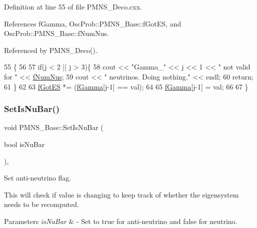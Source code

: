Definition at line 55 of file P\+M\+N\+S\+\_\+\+Deco.\+cxx.



References f\+Gamma, Osc\+Prob\+::\+P\+M\+N\+S\+\_\+\+Base\+::f\+Got\+ES, and Osc\+Prob\+::\+P\+M\+N\+S\+\_\+\+Base\+::f\+Num\+Nus.



Referenced by P\+M\+N\+S\+\_\+\+Deco().


\begin{DoxyCode}
55                                          \{
56 
57   \textcolor{keywordflow}{if}(j < 2 || j > 3)\{
58     cout << \textcolor{stringliteral}{"Gamma\_"} << j << 1 << \textcolor{stringliteral}{" not valid for "} << \hyperlink{classOscProb_1_1PMNS__Base_a24bb74bed63569dfe88b18fa6a08060e}{fNumNus};
59     cout << \textcolor{stringliteral}{" neutrinos. Doing nothing."} << endl;
60     \textcolor{keywordflow}{return};
61   \}
62 
63   \hyperlink{classOscProb_1_1PMNS__Base_a6dc5cd010d2d70b2324745b4e53e9839}{fGotES} *= (\hyperlink{classOscProb_1_1PMNS__Deco_ae2f30ac9f8b25344959f1698616d337a}{fGamma}[j-1] == val);
64   
65   \hyperlink{classOscProb_1_1PMNS__Deco_ae2f30ac9f8b25344959f1698616d337a}{fGamma}[j-1] = val;
66   
67 \}
\end{DoxyCode}
\mbox{\label{classOscProb_1_1PMNS__Base_a717e0348cf762f3961854e332a9b52e0}} 
\subsubsection{\texorpdfstring{Set\+Is\+Nu\+Bar()}{SetIsNuBar()}}
{\footnotesize\ttfamily void P\+M\+N\+S\+\_\+\+Base\+::\+Set\+Is\+Nu\+Bar (\begin{DoxyParamCaption}\item[{bool}]{is\+Nu\+Bar }\end{DoxyParamCaption})\hspace{0.3cm}{\ttfamily [virtual]}, {\ttfamily [inherited]}}

Set anti-\/neutrino flag.

This will check if value is changing to keep track of whether the eigensystem needs to be recomputed.


\begin{DoxyParams}{Parameters}
{\em is\+Nu\+Bar} & -\/ Set to true for anti-\/neutrino and false for neutrino. \\
\hline
\end{DoxyParams}



